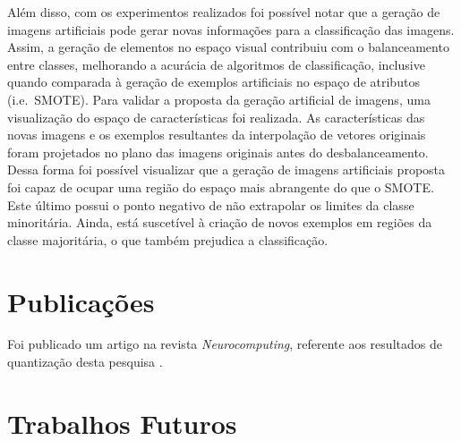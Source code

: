 Além disso, com os experimentos realizados foi possível notar que a geração de imagens artificiais pode gerar novas informações para a classificação das imagens. Assim, a geração de elementos no espaço visual contribuiu com o balanceamento entre classes, melhorando a acurácia de algoritmos de classificação, inclusive quando comparada à geração de exemplos artificiais no espaço de atributos (i.e.\ SMOTE). Para validar a proposta da geração artificial de imagens, uma visualização do espaço de características foi realizada. As características das novas imagens e os exemplos resultantes da interpolação de vetores originais foram projetados no plano das imagens originais antes do desbalanceamento. Dessa forma foi possível visualizar que a geração de imagens artificiais proposta foi capaz de ocupar uma região do espaço mais abrangente do que o SMOTE. Este último possui o ponto negativo de não extrapolar os limites da classe minoritária. Ainda, está suscetível à criação de novos exemplos em regiões da classe majoritária, o que também prejudica a classificação.

\section{Publicações}

Foi publicado um artigo na revista \textit{Neurocomputing}, referente aos resultados de quantização desta pesquisa \cite{Ponti2016}.



\section{Trabalhos Futuros}


